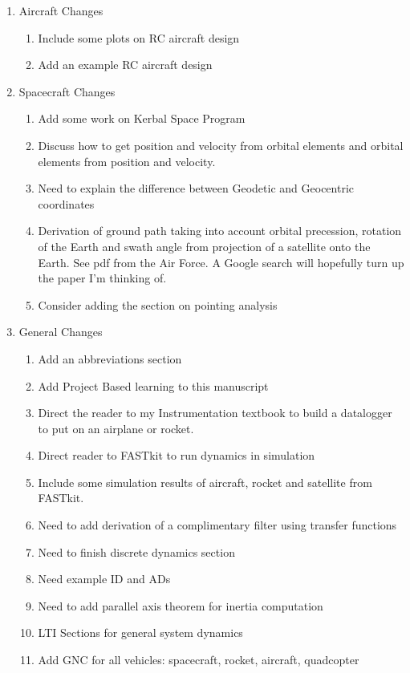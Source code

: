 \begin{enumerate}[itemsep=-5pt]
  \item Aircraft Changes
    \begin{enumerate}[itemsep=-5pt]
    \item Include some plots on RC aircraft design
    \item Add an example RC aircraft design
    \end{enumerate}
\item Spacecraft Changes
  \begin{enumerate}[itemsep=-5pt]
  \item Add some work on Kerbal Space Program
  \item Discuss how to get position and velocity from orbital elements and orbital elements
    from position and velocity.
  \item Need to explain the difference between Geodetic and Geocentric
    coordinates
  \item Derivation of ground path taking into account orbital
    precession, rotation of the Earth and swath angle from projection of
    a satellite onto the Earth. See pdf from the Air Force. A Google
    search will hopefully turn up the paper I'm thinking of.
  \item Consider adding the section on pointing analysis
  \end{enumerate}
\item General Changes
  \begin{enumerate}[itemsep=-5pt]
  \item Add an abbreviations section
  \item Add Project Based learning to this manuscript
  \item Direct the reader to my Instrumentation textbook to build a
    datalogger to put on an airplane or rocket.
  \item Direct reader to FASTkit to run dynamics in simulation
  \item Include some simulation results of aircraft, rocket and
    satellite from FASTkit.
  \item Need to add derivation of a complimentary filter using
    transfer functions
  \item Need to finish discrete dynamics section
  \item Need example ID and ADs
  \item Need to add parallel axis theorem for inertia computation
  \item LTI Sections for general system dynamics
  \item Add GNC for all vehicles: spacecraft, rocket, aircraft, quadcopter
  \end{enumerate}
\end{enumerate}

